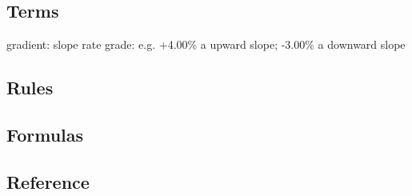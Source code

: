 \documentclass{article}
\begin{document}
  \subsection{Terms}
  gradient: slope rate
  grade: e.g. +4.00\% a upward slope; -3.00\% a downward slope

  \subsection{Rules}

  \subsection{Formulas}

  \subsection{Reference}


\end{document}
